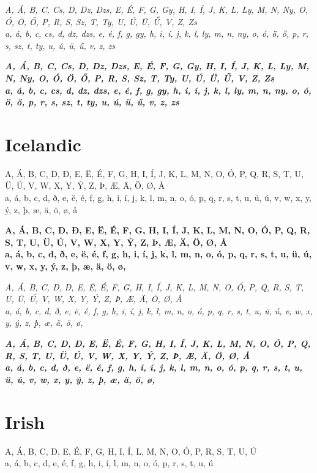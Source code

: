 \documentclass[12pt]{article}
\begin{document}
\textit{
A, Á, B, C, Cs, D, Dz, Dzs, E, É, F, G, Gy, H, I, Í, J, K, L, Ly, M, N,
Ny, O, Ó, Ö, Ő, P, R, S, Sz, T, Ty, U, Ú, Ü, Ű, V, Z, Zs\\
a, á, b, c, cs, d, dz, dzs, e, é, f, g, gy, h, i, í, j, k, l, ly, m, n,
ny, o, ó, ö, ő, p, r, s, sz, t, ty, u, ú, ü, ű, v, z, zs
}

\textbf{\textit{
A, Á, B, C, Cs, D, Dz, Dzs, E, É, F, G, Gy, H, I, Í, J, K, L, Ly, M, N,
Ny, O, Ó, Ö, Ő, P, R, S, Sz, T, Ty, U, Ú, Ü, Ű, V, Z, Zs\\
a, á, b, c, cs, d, dz, dzs, e, é, f, g, gy, h, i, í, j, k, l, ly, m, n,
ny, o, ó, ö, ő, p, r, s, sz, t, ty, u, ú, ü, ű, v, z, zs
}}


\section{Icelandic}
A, Á, B, C, D, Ð, E, Ë, É, F, G, H, I, Í, J, K, L, M, N, O, Ó, P, Q, R, S, T, U, Ü, Ú, V, W, X, Y, Ý, Z, Þ, Æ, Ä, Ö, Ø, Å \\
a, á, b, c, d, ð, e, ë, é, f, g, h, i, í, j, k, l, m, n, o, ó, p, q, r, s, t, u, ü, ú, v, w, x, y, ý, z, þ, æ, ä, ö, ø, å

\textbf{
A, Á, B, C, D, Ð, E, Ë, É, F, G, H, I, Í, J, K, L, M, N, O, Ó, P, Q, R, S, T, U, Ü, Ú, V, W, X, Y, Ý, Z, Þ, Æ, Ä, Ö, Ø, Å \\
a, á, b, c, d, ð, e, ë, é, f, g, h, i, í, j, k, l, m, n, o, ó, p, q, r, s, t, u, ü, ú, v, w, x, y, ý, z, þ, æ, ä, ö, ø,
}

\textit{
A, Á, B, C, D, Ð, E, Ë, É, F, G, H, I, Í, J, K, L, M, N, O, Ó, P, Q, R, S, T, U, Ü, Ú, V, W, X, Y, Ý, Z, Þ, Æ, Ä, Ö, Ø, Å \\
a, á, b, c, d, ð, e, ë, é, f, g, h, i, í, j, k, l, m, n, o, ó, p, q, r, s, t, u, ü, ú, v, w, x, y, ý, z, þ, æ, ä, ö, ø,
}

\textbf{\textit{
A, Á, B, C, D, Ð, E, Ë, É, F, G, H, I, Í, J, K, L, M, N, O, Ó, P, Q, R, S, T, U, Ü, Ú, V, W, X, Y, Ý, Z, Þ, Æ, Ä, Ö, Ø, Å \\
a, á, b, c, d, ð, e, ë, é, f, g, h, i, í, j, k, l, m, n, o, ó, p, q, r, s, t, u, ü, ú, v, w, x, y, ý, z, þ, æ, ä, ö, ø,
}}


\clearpage
\section{Irish}
A, Á, B, C, D, E, É, F, G, H, I, Í, L, M, N, O, Ó, P, R, S, T, U, Ú \\
a, á, b, c, d, e, é, f, g, h, i, í, l, m, n, o, ó, p, r, s, t, u, ú
\end{document}
